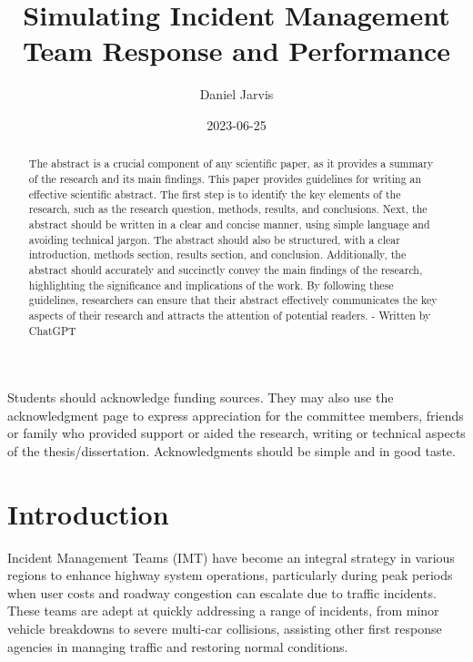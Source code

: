 \documentclass[fancy, oneside, mastersfancy, ms]{byuthesis}
\title{Simulating Incident Management Team Response and Performance}
\author{Daniel Jarvis}
\date{2023-06-25}
\begin{document}
\frontmatter
\titlepage
\cleardoublepage

\customtitlepage
\cleardoublepage


  \begin{abstract}
The abstract is a crucial component of any scientific paper, as it
provides a summary of the research and its main findings. This paper
provides guidelines for writing an effective scientific abstract. The
first step is to identify the key elements of the research, such as the
research question, methods, results, and conclusions. Next, the abstract
should be written in a clear and concise manner, using simple language
and avoiding technical jargon. The abstract should also be structured,
with a clear introduction, methods section, results section, and
conclusion. Additionally, the abstract should accurately and succinctly
convey the main findings of the research, highlighting the significance
and implications of the work. By following these guidelines, researchers
can ensure that their abstract effectively communicates the key aspects
of their research and attracts the attention of potential readers. -
Written by ChatGPT
\end{abstract}
\cleardoublepage

\begin{acknowledgments}
Students should acknowledge funding sources. They may also use the
acknowledgment page to express appreciation for the committee members,
friends or family who provided support or aided the research, writing or
technical aspects of the thesis/dissertation. Acknowledgments should be
simple and in good taste.
\end{acknowledgments}
\cleardoublepage

	\tableofcontents*
	\cleardoublepage

	\listoffigures
	\cleardoublepage

	\listoftables
	\cleardoublepage

\mainmatter
{}

\hypertarget{introduction}{%
\chapter{Introduction}\label{introduction}}

Incident Management Teams (IMT) have become an integral strategy in
various regions to enhance highway system operations, particularly
during peak periods when user costs and roadway congestion can escalate
due to traffic incidents. These teams are adept at quickly addressing a
range of incidents, from minor vehicle breakdowns to severe multi-car
collisions, assisting other first response agencies in managing traffic
and restoring normal conditions.
\end{document}
